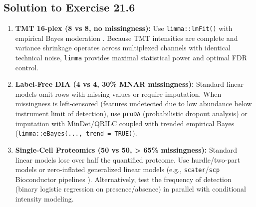 \documentclass[11pt,twoside,openright]{book}
\begin{document}
\subsection*{Solution to Exercise 21.6}
\begin{enumerate}
    \item \textbf{TMT 16-plex (8 vs 8, no missingness):} Use \texttt{limma::lmFit()} with empirical Bayes moderation \cite{smyth2004linear, ritchie2015limma}. Because TMT intensities are complete and variance shrinkage operates across multiplexed channels with identical technical noise, \texttt{limma} provides maximal statistical power and optimal FDR control.
    \item \textbf{Label-Free DIA (4 vs 4, 30\% MNAR missingness):} Standard linear models omit rows with missing values or require imputation. When missingness is left-censored (features undetected due to low abundance below instrument limit of detection), use \texttt{proDA} (probabilistic dropout analysis) \cite{ahlmann2020proda} or imputation with MinDet/QRILC \cite{lazar2016accounting} coupled with trended empirical Bayes (\texttt{limma::eBayes(..., trend = TRUE)}).
    \item \textbf{Single-Cell Proteomics (50 vs 50, > 65\% missingness):} Standard linear models lose over half the quantified proteome. Use hurdle/two-part models or zero-inflated generalized linear models (e.g., \texttt{scater}/\texttt{scp} Bioconductor pipelines \cite{vanderaa2023scp}). Alternatively, test the frequency of detection (binary logistic regression on presence/absence) in parallel with conditional intensity modeling.
\end{enumerate}
\end{document}
